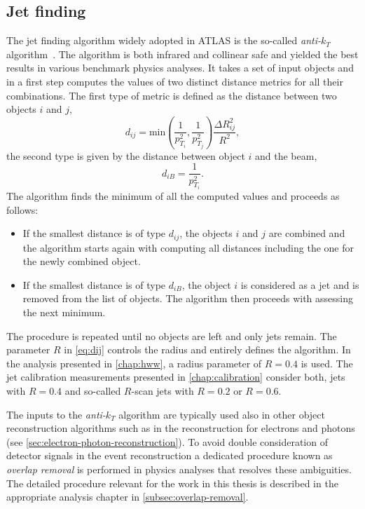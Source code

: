 \subsection{Jet finding}
The jet finding algorithm widely adopted in ATLAS is the so-called \emph{anti-$k_T$} algorithm~\cite{Cacciari:2008gp}. The algorithm is both infrared and collinear safe and yielded the best results in various benchmark physics analyses. 
It takes a set of input objects and in a first step computes the values of two distinct distance metrics for all their combinations.
The first type of metric is defined as the distance between two objects $i$ and $j$, 
\begin{equation}
    d_{ij} = \text{min}\left(\frac{1}{p_{T_i}^2},\frac{1}{p_{T_j}^2}\right) \frac{\Delta R_{ij}^2}{R^2},
    \label{eq:dij}
\end{equation}
the second type is given by the distance between object $i$ and the beam, 
    \begin{equation}
        d_{iB} = \frac{1}{p_{T_i}^2}.
\end{equation}
The algorithm finds the minimum of all the computed values and proceeds as follows:
\begin{itemize}
    \item If the smallest distance is of type $d_{ij}$, the objects $i$ and $j$ are combined and the algorithm starts again with computing all distances including the one for the newly combined object.
    \item If the smallest distance is of type $d_{iB}$, the object $i$ is considered as a jet and is removed from the list of objects. The algorithm then proceeds with assessing the next minimum.
\end{itemize}
The procedure is repeated until no objects are left and only jets remain. 
The parameter $R$ in \cref{eq:dij} controls the radius and entirely defines the algorithm. 
In the \HWW analysis presented in \cref{chap:hww}, a radius parameter of $R = 0.4$ is used. The jet calibration measurements presented in \cref{chap:calibration} consider both, jets with $R = 0.4$ and so-called $R$-scan jets with $R = 0.2$ or $R = 0.6$.

The inputs to the \emph{anti-$k_T$} algorithm are typically used also in other object reconstruction algorithms such as in the reconstruction for electrons and photons (see \cref{sec:electron-photon-reconstruction}). 
To avoid double consideration of detector signals in the event reconstruction a dedicated procedure known as \emph{overlap removal} is performed in physics analyses that resolves these ambiguities. The detailed procedure relevant for the work in this thesis is described in the appropriate analysis chapter in \cref{subsec:overlap-removal}.


